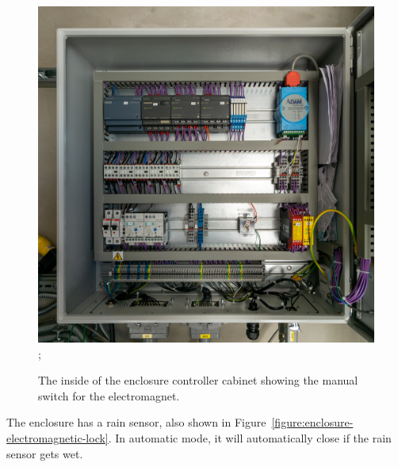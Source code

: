\begin{figure}
\begin{center}
{\begin{labeled}{\includegraphics[width=\linewidth]{figures/enclosure-controller-inside-ddoti.jpg}}
;
\end{labeled}}
\fi
\end{center}
\caption{The inside of the enclosure controller cabinet showing the manual switch for the electromagnet.}
\label{figure:enclosure-controller-manual-lock-switch}
\end{figure}

The enclosure has a rain sensor, also shown in Figure~\ref{figure:enclosure-electromagnetic-lock}. In automatic mode, it will automatically close if the rain sensor gets wet.

